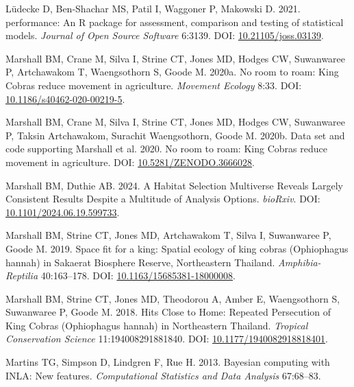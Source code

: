 \documentclass[10pt,a4paper]{article}
\newlength{\cslhangindent}
\newenvironment{CSLReferences}[2] %
 {\begin{list}{}{%
  \setlength{\itemindent}{0pt}
  \setlength{\leftmargin}{0pt}
  \setlength{\parsep}{0pt}
  \ifodd #1
   \setlength{\leftmargin}{\cslhangindent}
   \setlength{\itemindent}{-1\cslhangindent}
  \fi
  \setlength{\itemsep}{#2\baselineskip}}}
 {\end{list}}
\begin{document}
\begin{CSLReferences}{1}{0}
Lüdecke D, Ben-Shachar MS, Patil I, Waggoner P, Makowski D. 2021. {performance}: An {R} package for assessment, comparison and testing of statistical models. \emph{Journal of Open Source Software} 6:3139. DOI: \href{https://doi.org/10.21105/joss.03139}{10.21105/joss.03139}.

Marshall BM, Crane M, Silva I, Strine CT, Jones MD, Hodges CW, Suwanwaree P, Artchawakom T, Waengsothorn S, Goode M. 2020a. No room to roam: {King} {Cobras} reduce movement in agriculture. \emph{Movement Ecology} 8:33. DOI: \href{https://doi.org/10.1186/s40462-020-00219-5}{10.1186/s40462-020-00219-5}.

Marshall BM, Crane M, Silva I, Strine CT, Jones MD, Hodges CW, Suwanwaree P, Taksin Artchawakom, Surachit Waengsothorn, Goode M. 2020b. Data set and code supporting {Marshall} et al. 2020. {No} room to roam: {King} {Cobras} reduce movement in agriculture. DOI: \href{https://doi.org/10.5281/ZENODO.3666028}{10.5281/ZENODO.3666028}.

Marshall BM, Duthie AB. 2024. A {Habitat} {Selection} {Multiverse} {Reveals} {Largely} {Consistent} {Results} {Despite} a {Multitude} of {Analysis} {Options}. \emph{bioRxiv}. DOI: \href{https://doi.org/10.1101/2024.06.19.599733}{10.1101/2024.06.19.599733}.

Marshall BM, Strine CT, Jones MD, Artchawakom T, Silva I, Suwanwaree P, Goode M. 2019. Space fit for a king: Spatial ecology of king cobras ({Ophiophagus} hannah) in {Sakaerat} {Biosphere} {Reserve}, {Northeastern} {Thailand}. \emph{Amphibia-Reptilia} 40:163--178. DOI: \href{https://doi.org/10.1163/15685381-18000008}{10.1163/15685381-18000008}.

Marshall BM, Strine CT, Jones MD, Theodorou A, Amber E, Waengsothorn S, Suwanwaree P, Goode M. 2018. Hits {Close} to {Home}: {Repeated} {Persecution} of {King} {Cobras} ({Ophiophagus} hannah) in {Northeastern} {Thailand}. \emph{Tropical Conservation Science} 11:194008291881840. DOI: \href{https://doi.org/10.1177/1940082918818401}{10.1177/1940082918818401}.

Martins TG, Simpson D, Lindgren F, Rue H. 2013. Bayesian computing with {INLA}: {N}ew features. \emph{Computational Statistics and Data Analysis} 67:68--83.


\end{CSLReferences}
\end{document}
